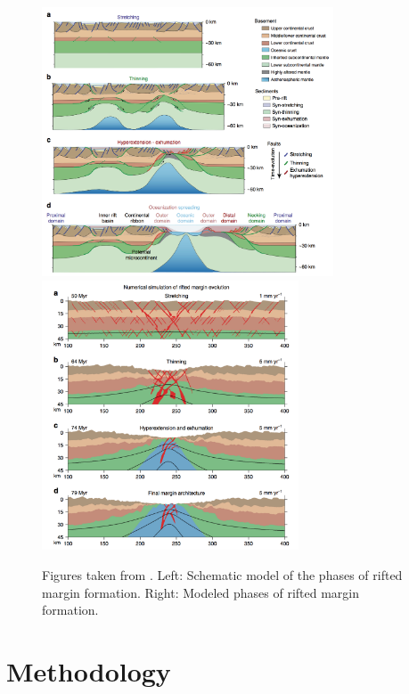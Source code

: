 \documentclass[a4paper]{article}
\begin{document}
\begin{figure}
\centering
\includegraphics[height=8cm]{images/nabp1}
\includegraphics[height=8cm]{images/nabp2}
\caption{Figures taken from \cite{nabp17}. Left: Schematic model of the phases of rifted margin formation. Right: Modeled phases of rifted margin formation. \label{fignabp17}}
\end{figure}




\newpage
\section{Methodology}
\end{document}
